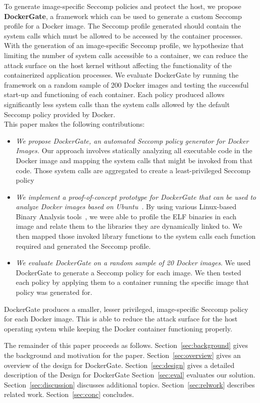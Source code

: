 To generate image-specific Seccomp policies and protect the host, we propose \textbf{DockerGate}, a framework which can be used to generate a custom Seccomp profile for a Docker image. The Seccomp profile generated should contain the system calls which must be allowed to be accessed by the container processes. With the generation of an image-specific Seccomp profile, we hypothesize that limiting the number of system calls accessible to a container, we can reduce the attack surface on the host kernel without affecting the functionality of the containerized application processes. We evaluate DockerGate by running the framework on a random sample of 200 Docker images and testing the successful start-up and functioning of each container. Each policy produced allows significantly less system calls than the system calls allowed by the default Seccomp policy provided by Docker.
\hfill \break
\\This paper makes the following contributions:
\begin{itemize}
\item
\textit{We propose DockerGate, an automated Seccomp policy generator for Docker Images.} Our approach involves statically analyzing all executable code in the Docker image and mapping the system calls that might be invoked from that code. Those system calls are aggregated to create a least-privileged Seccomp policy 
\end{itemize}
\begin{itemize}
\item 
\textit{We implement a proof-of-concept prototype for DockerGate that can be used to analyze Docker images based on Ubuntu~\cite{ubuntu}}. By using various Linux-based Binary Analysis tools~\cite{nm,ldd,objdump}, we were able to profile the ELF binaries in each image and relate them to the libraries they are dynamically linked to. We then mapped those invoked library functions to the system calls each function required and generated the Seccomp profile.
\end{itemize}
\begin{itemize}
\item
\textit{We evaluate DockerGate on a random sample of 20 Docker images}. We used DockerGate to generate a Seccomp policy for each image. We then tested each policy by applying them to a container running the specific image that policy was generated for.
\end{itemize}

 DockerGate produces a smaller, lesser privileged, image-specific Seccomp policy for each Docker image. This is able to reduce the attack surface for the host operating system while keeping the Docker container functioning properly.

The remainder of this paper proceeds as follows.
Section~\ref{sec:background} gives the background and motivation for the paper.
Section~\ref{sec:overview} gives an overview of the design for DockerGate.
Section~\ref{sec:design} gives a detailed description of the Design for DockerGate
Section~\ref{sec:eval} evaluates our solution.
Section~\ref{sec:discussion} discusses additional topics.
Section~\ref{sec:relwork} describes related work. Section~\ref{sec:conc}
concludes.
